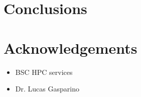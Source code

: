 \documentclass[final,3p,times]{elsarticle}
\begin{document}
\section{Conclusions}\label{sec:conclusions}

\section{Acknowledgements}\label{sec:acknowledgements}
\begin{itemize}
    \item BSC HPC services
    \item Dr. Lucas Gasparino
\end{itemize}



\end{document}
